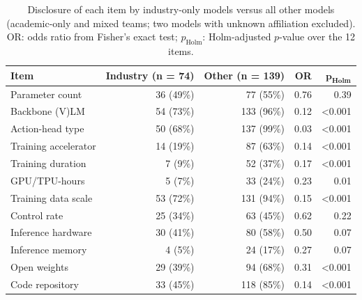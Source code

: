 \begin{table}[H]
\caption{Disclosure of each item by industry-only models versus all other models (academic-only and mixed teams; two models with unknown affiliation excluded). OR: odds ratio from Fisher's exact test; $p_\text{Holm}$: Holm-adjusted $p$-value over the 12 items.\label{tab:tests}}
\small
\begin{tabularx}{\textwidth}{@{}X r r r r@{}}
\toprule
\textbf{Item} & \textbf{Industry (n = 74)} & \textbf{Other (n = 139)} & \textbf{OR} & $\boldsymbol{p}_\textbf{Holm}$\\
\midrule
Parameter count & 36 (49\%) & 77 (55\%) & 0.76 & 0.39\\
Backbone (V)LM & 54 (73\%) & 133 (96\%) & 0.12 & <0.001\\
Action-head type & 50 (68\%) & 137 (99\%) & 0.03 & <0.001\\
Training accelerator & 14 (19\%) & 87 (63\%) & 0.14 & <0.001\\
Training duration & 7 (9\%) & 52 (37\%) & 0.17 & <0.001\\
GPU/TPU-hours & 5 (7\%) & 33 (24\%) & 0.23 & 0.01\\
Training data scale & 53 (72\%) & 131 (94\%) & 0.15 & <0.001\\
Control rate & 25 (34\%) & 63 (45\%) & 0.62 & 0.22\\
Inference hardware & 30 (41\%) & 80 (58\%) & 0.50 & 0.07\\
Inference memory & 4 (5\%) & 24 (17\%) & 0.27 & 0.07\\
Open weights & 29 (39\%) & 94 (68\%) & 0.31 & <0.001\\
Code repository & 33 (45\%) & 118 (85\%) & 0.14 & <0.001\\
\bottomrule
\end{tabularx}
\end{table}
